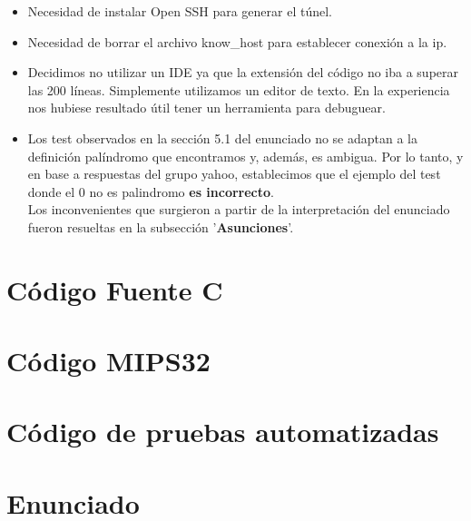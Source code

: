 \documentclass[a4paper,10pt]{article}
\begin{document}
\begin{itemize}
	\item Necesidad de instalar Open SSH para generar el t\'unel.
	\item Necesidad de borrar el archivo know\_host para establecer
	conexi\'on a la ip.
	\item Decidimos no utilizar un IDE ya que la extensi\'on del
	c\'odigo no iba a superar las 200 l\'ineas.
	Simplemente utilizamos un editor de texto.
	En la experiencia nos hubiese resultado \'util tener
	un herramienta para debuguear.
	\item Los test observados en la secci\'on 5.1 del enunciado no
	se adaptan a la definici\'on pal\'indromo que encontramos y,
	adem\'as, es ambigua. Por lo tanto, y en base a respuestas del
	grupo yahoo, establecimos que el ejemplo del test donde
	el 0 no es palindromo \textbf{es incorrecto}.\\
	Los inconvenientes que surgieron a partir de la interpretaci\'on
	del enunciado fueron resueltas en la subsecci\'on '\textbf{Asunciones}'.
\end{itemize}

\newpage
\section{C\'odigo Fuente C}


\newpage
\section{C\'odigo MIPS32}


\newpage
\section{C\'odigo de pruebas automatizadas}


\newpage
\section{Enunciado}


\end{document}
